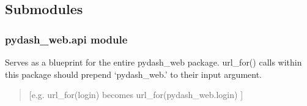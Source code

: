 \documentclass[letterpaper,10pt,english]{sphinxmanual}
\begin{document}
\begin{fulllineitems}
\label{\detokenize{pydash_web.controller.visitor_heatmap:pydash_web.controller.visitor_heatmap.daterange}}
\end{fulllineitems}


\begin{fulllineitems}
\label{\detokenize{pydash_web.controller.visitor_heatmap:pydash_web.controller.visitor_heatmap.get_hourly_data}}
\end{fulllineitems}


\begin{fulllineitems}
\label{\detokenize{pydash_web.controller.visitor_heatmap:pydash_web.controller.visitor_heatmap.visitor_heatmap}}
\end{fulllineitems}



\subsection{Submodules}
\label{\detokenize{pydash_web:submodules}}

\subsubsection{pydash\_web.api module}
\label{\detokenize{pydash_web.api::doc}}\label{\detokenize{pydash_web.api:module-pydash_web.api}}\label{\detokenize{pydash_web.api:pydash-web-api-module}}
Serves as a blueprint for the entire pydash\_web package.
url\_for() calls within this package should prepend ‘pydash\_web.’ to their input argument.
\begin{quote}

{[}e.g. url\_for(login) becomes url\_for(pydash\_web.login) {]}
\end{quote}
\end{document}
